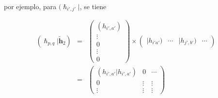 \documentclass{beamer}
\begin{document}
\small
\begin{frame}
  por ejemplo, para $( \bm{\hslash}_{i',j'} | $, se tiene

\begin{eqnarray*} \label{hslash_qp}
	( \bm{\hslash}_{p,q} | \bm{\widetilde{h}}_2 )
		 &=& \begin{pmatrix}
		(h_{i',a'}) \\
		\vdots \\
		0 \\
		\vdots \\
		0
	\end{pmatrix}  \times  \begin{pmatrix}
		|h_{i'a'}) & \cdots & |h_{j',b'}) &  \cdots
	\end{pmatrix}            \\
     & = & \begin{pmatrix}
		 (h_{i',a'} | h_{i',a'}) & 0 & \cdots \\
		 0 & \vdots & \vdots \\
		 \vdots & \vdots & \vdots 
	 \end{pmatrix} 
\end{eqnarray*}

\end{frame}
\end{document}
